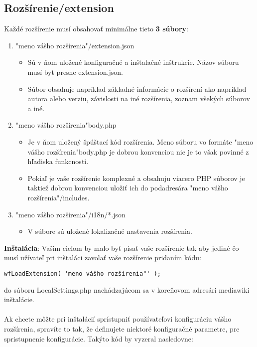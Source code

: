 \subsection{Rozšírenie/extension}
Každé rozšírenie musí obsahovať minimálne tieto \textbf{3 súbory}:\\

\begin{enumerate}
	\item "meno vášho rozšírenia"/extension.json
	\begin{itemize}
		\item Sú v ňom uložené konfiguračné a inštalačné inštrukcie. Názov súboru musí byt presne extension.json. 
		\item Súbor obsahuje napríklad základné informácie o rozšírení ako napríklad autora alebo verziu, závislosti na iné rozšírenia, zoznam všekých súborov a iné.
	\end{itemize}
	\item "meno vášho rozšírenia"body.php
	\begin{itemize}
		\item Je v ňom uložený špúštací kód rozšírenia. Meno súboru vo formáte "meno vášho rozšírenia"body.php je dobrou konvenciou nie je to však povinné z hľadiska funkcnosti.
		 
		\item Pokiaľ je vaše rozšírenie komplexné a obsahuju viacero PHP súborov je taktiež dobrou konvenciou uložiť ich do podadresára "meno vášho rozšírenia"/includes. 
	\end{itemize}
	\item "meno vášho rozšírenia"/i18n/*.json
	\begin{itemize}
		\item V súbore sú uložené lokalizačné nastavenia rozšírenia.
	\end{itemize}
\end{enumerate}
\textbf{Inštalácia}:
Vašim cieľom by malo byť písať vaše rozšírenie tak aby jediné čo musí užívateľ pri inštaláci zavolať vaše rozšírenie pridaním kódu:
\begin{verbatim}
wfLoadExtension( 'meno vášho rozšírenia"' ); 
\end{verbatim} 
do súboru LocalSettings.php nachádzajúcom sa v koreňovom adresári mediawiki inštalácie.\\
\\
Ak chcete môžte pri inštalácií sprístupniť používateľovi konfiguráciu vášho rozšírenia, spravíte to tak, že definujete niektoré konfiguračné parametre, pre spristupnenie konfigurácie. Takýto kód by vyzeral nasledovne:\\
